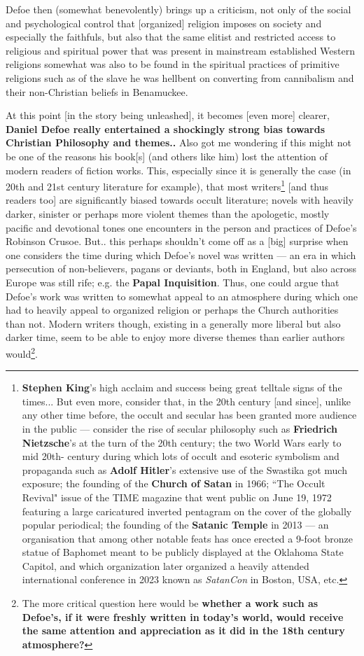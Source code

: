 \documentclass[a4paper]{article}
\begin{document}
Defoe then (somewhat benevolently) brings up a criticism, not only of the social and psychological control that [organized] religion imposes on society and especially the faithfuls, but also that the same elitist and restricted access to religious and spiritual power that was present in mainstream established Western religions somewhat was also to be found in the spiritual practices of primitive religions such as of the slave he was hellbent on converting from cannibalism and their non-Christian beliefs in Benamuckee.

At this point [in the story being unleashed], it becomes [even more] clearer, \textbf{Daniel Defoe really entertained a shockingly strong bias towards Christian Philosophy and themes..}  Also got me wondering if this might not be one of the reasons his book[s] (and others like him) lost the attention of modern readers of fiction works. This, especially since it is generally the case (in 20th and 21st century literature for example), that most writers\footnote{\textbf{Stephen King}'s high acclaim and success \cite{King2000} being great telltale signs of the times... But even more, consider that, in the 20th century [and since], unlike any other time before, the occult and secular has been granted more audience in the public --- consider the rise of secular philosophy such as \textbf{Friedrich Nietzsche}'s at the turn of the 20th century; the two World Wars early to mid 20th- century during which lots of occult and esoteric symbolism and propaganda such as \textbf{Adolf Hitler}'s extensive use of the Swastika got much exposure; the founding of the \textbf{Church of Satan} in 1966; ``The Occult Revival" issue of the TIME magazine that went public on June 19, 1972 featuring a large caricatured inverted pentagram on the cover of the globally popular periodical; the founding of the \textbf{Satanic Temple} in 2013 --- an organisation that among other notable feats has once erected a 9-foot bronze statue of Baphomet meant to be publicly displayed at the Oklahoma State Capitol, and which organization later organized a heavily attended international conference in 2023 known as \textit{SatanCon} in Boston, USA, etc.} [and thus readers too] are significantly biased towards occult literature; novels with heavily darker, sinister or perhaps more violent themes than the apologetic, mostly pacific and devotional tones one encounters in the person and practices of Defoe's Robinson Crusoe. But.. this perhaps shouldn't come off as a [big] surprise when one considers the time during which Defoe's novel was written --- an era in which persecution of non-believers, pagans or deviants, both in England, but also across Europe was still rife; e.g. the \textbf{Papal Inquisition}. Thus, one could argue that Defoe's work was written to somewhat appeal to an atmosphere during which one had to heavily appeal to organized religion or perhaps the Church authorities than not. Modern writers though, existing in a generally more liberal but also darker time, seem to be able to enjoy more diverse themes than earlier authors would\footnote{The more critical question here would be \textbf{whether a work such as Defoe's, if it were freshly written in today's world, would receive the same attention and appreciation as it did in the 18th century atmosphere?}}.
\end{document}
